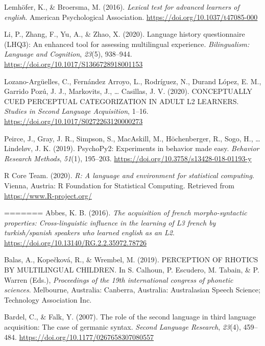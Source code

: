 \documentclass[
  english,
  man]{apa6}
\newlength{\cslhangindent}
\newenvironment{CSLReferences}[2] %
 {%
  \setlength{\parindent}{0pt}
  \ifodd #1 \everypar{\setlength{\hangindent}{\cslhangindent}}\ignorespaces\fi
  \ifnum #2 > 0
  \setlength{\parskip}{#2\baselineskip}
  \fi
 }%
 {}
\begin{document}
\begin{CSLReferences}{1}{0}
\leavevmode{}%
Lemhöfer, K., \& Broersma, M. (2016). \emph{Lexical test for advanced learners of english}. American Psychological Association. \url{https://doi.org/10.1037/t47085-000}

\leavevmode{}%
Li, P., Zhang, F., Yu, A., \& Zhao, X. (2020). Language history questionnaire ({LHQ}3): An enhanced tool for assessing multilingual experience. \emph{Bilingualism: Language and Cognition}, \emph{23}(5), 938--944. \url{https://doi.org/10.1017/S1366728918001153}

\leavevmode{}%
Lozano-Argüelles, C., Fernández Arroyo, L., Rodríguez, N., Durand López, E. M., Garrido Pozú, J. J., Markovits, J., \ldots{} Casillas, J. V. (2020). {CONCEPTUALLY} {CUED} {PERCEPTUAL} {CATEGORIZATION} {IN} {ADULT} L2 {LEARNERS}. \emph{Studies in Second Language Acquisition}, 1--16. \url{https://doi.org/10.1017/S0272263120000273}

\leavevmode{}%
Peirce, J., Gray, J. R., Simpson, S., MacAskill, M., Höchenberger, R., Sogo, H., \ldots{} Lindeløv, J. K. (2019). {PsychoPy}2: Experiments in behavior made easy. \emph{Behavior Research Methods}, \emph{51}(1), 195--203. \url{https://doi.org/10.3758/s13428-018-01193-y}

\leavevmode{}%
R Core Team. (2020). \emph{R: A language and environment for statistical computing}. Vienna, Austria: R Foundation for Statistical Computing. Retrieved from \url{https://www.R-project.org/}

=======
\leavevmode\hypertarget{ref-abbes_acquisition_2016}{}%
Abbes, K. B. (2016). \emph{The acquisition of french morpho-syntactic properties: Cross-linguistic influence in the learning of L3 french by turkish/spanish speakers who learned english as an L2}. \url{https://doi.org/10.13140/RG.2.2.35972.78726}

\leavevmode\hypertarget{ref-balas_perception_2019}{}%
Balas, A., Kopečková, R., \& Wrembel, M. (2019). {PERCEPTION} {OF} {RHOTICS} {BY} {MULTILINGUAL} {CHILDREN}. In S. Calhoun, P. Escudero, M. Tabain, \& P. Warren (Eds.), \emph{Proceedings of the 19th international congress of phonetic sciences}. Melbourne, Australia: Canberra, Australia: Australasian Speech Science; Technology Association Inc.

\leavevmode\hypertarget{ref-bardel_role_2007}{}%
Bardel, C., \& Falk, Y. (2007). The role of the second language in third language acquisition: The case of germanic syntax. \emph{Second Language Research}, \emph{23}(4), 459--484. \url{https://doi.org/10.1177/0267658307080557}


\end{CSLReferences}
\end{document}
